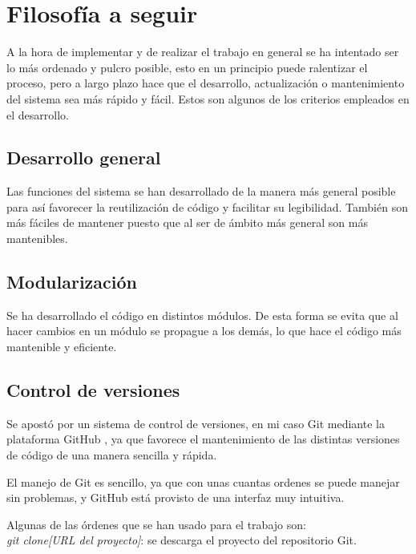 \newpage
\section{Filosofía a seguir}
\bigskip
A la hora de implementar y de realizar el trabajo en general se ha intentado ser lo más ordenado y pulcro posible, esto en un principio  puede ralentizar el proceso, pero a largo plazo hace que el desarrollo, actualización o mantenimiento del sistema sea más rápido y fácil. Estos son algunos de los criterios empleados en el desarrollo.

\bigskip
\subsection{Desarrollo general}
\bigskip

Las funciones del sistema se han desarrollado de la manera más general posible para así favorecer la reutilización de código y facilitar su legibilidad. También son más fáciles de mantener puesto que al ser de ámbito más general son más mantenibles.

\bigskip
\subsection{Modularización}
\bigskip

Se ha desarrollado el código en distintos módulos. De esta forma se evita que al hacer cambios en un módulo se propague a los demás, lo que hace el código más mantenible y eficiente.

\bigskip
\subsection{Control de versiones}
\bigskip

Se apostó por un sistema de control de versiones, en mi caso Git mediante la plataforma GitHub \cite{github}, ya que favorece el mantenimiento de las distintas versiones de código de una manera sencilla y rápida.

El manejo de Git es sencillo, ya que con unas cuantas ordenes se puede manejar sin problemas, y GitHub está provisto de una interfaz muy intuitiva. 

\bigskip
Algunas de las órdenes que se han usado para el trabajo son:\\


\textit{git clone[URL del proyecto]}: se descarga el proyecto del repositorio Git.\\


